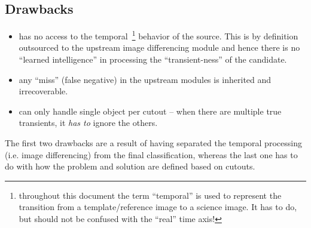 


\subsection{Drawbacks}
\begin{itemize}
\item has no access to the temporal~\footnote{throughout this document the term ``temporal'' is used to represent the transition from a template/reference image to a science image. It has to do, but should not be confused with the ``real'' time axis!} behavior of the source. This is by definition outsourced to the upstream image differencing module and hence there is no ``learned intelligence'' in processing the ``transient-ness'' of the candidate.
\item any ``miss'' (false negative) in the upstream modules is inherited and irrecoverable.
\item can only handle single object per cutout -- when there are multiple true transients, it \emph{has to} ignore the others.
\end{itemize}

The first two drawbacks are a result of having separated the temporal processing (i.e. image differencing) from the final classification, whereas the last one has to do with how the problem and solution are defined based on cutouts.



